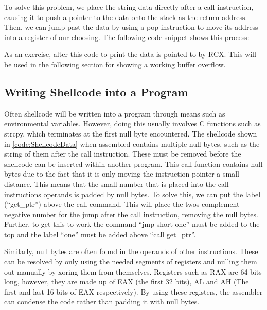 \documentclass[a4paper,11pt]{report}
\begin{document}
			To solve this problem, we place the string data directly after a call instruction, causing it to push a pointer to the data onto the stack as the return address. 
			Then, we can jump past the data by using a pop instruction to move its address into a register of our choosing. 
			The following code snippet shows this process:
			\begin{code}
				Assembler}]{./ShellcodeData.asm}
				\caption{Getting a Data Pointer in Shellcode}
				\label{code:ShellcodeData}
			\end{code}

			As an exercise, alter this code to print the data is pointed to by RCX. 
			This will be used in the following section for showing a working buffer overflow. 

		\subsection{Writing Shellcode into a Program}
			Often shellcode will be written into a program through means such as environmental variables. 
			However, doing this usually involves C functions such as strcpy, which terminates at the first null byte encountered. 
			The shellcode shown in \ref{code:ShellcodeData} when assembled contains multiple null bytes, such as the string of them after the call instruction.
			These must be removed before the shellcode can be inserted within another program. 
			This call function contains null bytes due to the fact that it is only moving the instruction pointer a small distance. 
			This means that the small number that is placed into the call instructions operands is padded by null bytes. 
			To solve this, we can put the label (``get\_ptr'') above the call command. 
			This will place the twos complement negative number for the jump after the call instruction, removing the null bytes. 
			Further, to get this to work the command ``jmp short one'' must be added to the top and the label ``one'' must be added above ``call get\_ptr''.

			Similarly, null bytes are often found in the operands of other instructions. 
			These can be resolved by only using the needed segments of registers and nulling them out manually by xoring them from themselves. 
			Registers such as RAX are 64 bits long, however, they are made up of EAX (the first 32 bits), AL and AH (The first and last 16 bits of EAX respectively).
			By using these registers, the assembler can condense the code rather than padding it with null bytes. 
\end{document}
